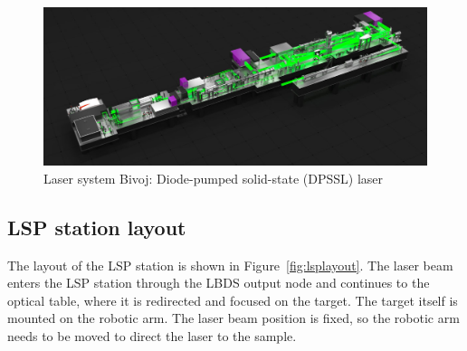  \begin{figure}[h]
    \centering
    \includegraphics[width=1.0\linewidth]{img/bivoj.jpg}
    \caption[Laser system Bivoj: Diode-pumped solid-state (DPSSL) laser]{Laser system Bivoj: Diode-pumped solid-state (DPSSL) laser \protect\cite{bivojiso}}
    \label{fig:bivoj}
\end{figure}
 
 \subsection{LSP station layout}
 \label{sec:lsp_layout}

The layout of the LSP station is shown in Figure~\ref{fig:lsplayout}. The laser beam enters the LSP station through the LBDS output node and continues to the optical table, where it is redirected and focused on the target. The target itself is mounted on the robotic arm. The laser beam position is fixed, so the robotic arm needs to be moved to direct the laser to the sample.

